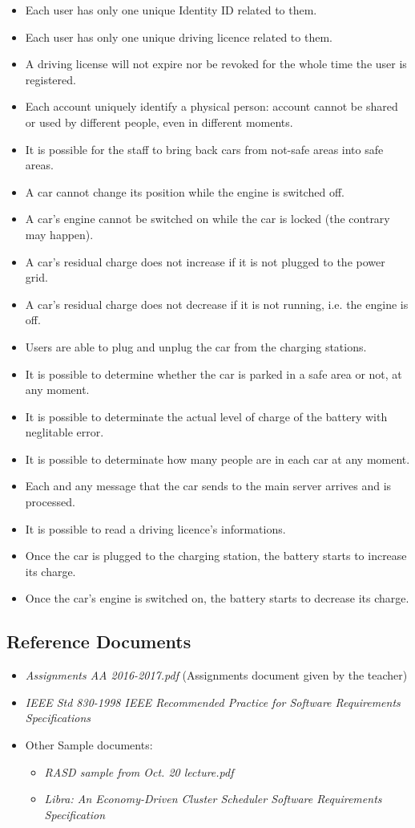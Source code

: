 \documentclass[11pt]{article} %
\begin{document}
\begin{itemize}
	\item Each user has only one unique Identity ID related to them.
	\item Each user has only one unique driving licence related to them.
	\item A driving license will not expire nor be revoked for the whole time the user is registered.
	\item Each account uniquely identify a physical person: account cannot be shared or used by different people, even in different moments.
	\item It is possible for the staff to bring back cars from not-safe areas into safe areas.
	\item A car cannot change its position while the engine is switched off.
	\item A car's engine cannot be switched on while the car is locked (the contrary may happen).
	\item A car's residual charge does not increase if it is not plugged to the power grid.
	\item A car's residual charge does not decrease if it is not running, i.e. the engine is off.
	\item Users are able to plug and unplug the car from the charging stations.
	\item It is possible to determine whether the car is parked in a safe area or not, at any moment.
	\item It is possible to determinate the actual level of charge of the battery with neglitable error.
	\item It is possible to determinate how many people are in each car at any moment.
	\item Each and any message that the car sends to the main server arrives and is processed.
	\item It is possible to read a driving licence's informations.
	\item Once the car is plugged to the charging station, the battery starts to increase its charge.
	\item Once the car's engine is switched on, the battery starts to decrease its charge.
\end{itemize}


\subsection{Reference Documents}
\begin{itemize}
	\item \textit{Assignments AA 2016-2017.pdf} (Assignments document given by the teacher)
	\item \textit{IEEE Std 830-1998 IEEE Recommended Practice for Software Requirements Specifications}
	\item Other Sample documents:
		\begin{itemize}
			\item \textit{RASD sample from Oct. 20 lecture.pdf}
			\item \textit{Libra: An Economy-Driven Cluster Scheduler Software Requirements Specification}
		\end{itemize}
  \end{itemize}
\end{document}
